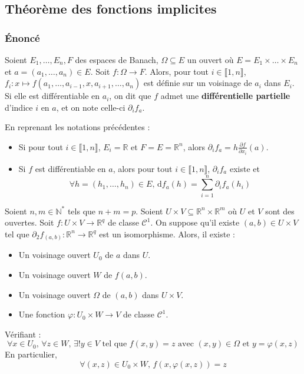 	\subsection{Théorème des fonctions implicites}
	
	\subsubsection{Énoncé}
	
	
	\begin{definition}
		Soient $E_1, \dots, E_n, F$ des espaces de Banach, $\Omega \subseteq E$ un ouvert où $E = E_1 \times \dots \times E_n$ et $a = (a_1, \dots, a_n) \in E$. Soit $f : \Omega \rightarrow F$. Alors, pour tout $i \in \llbracket 1, n \rrbracket$, $f_i : x \mapsto f(a_1, \dots, a_{i-1}, x, a_{i+1}, \dots, a_n)$ est définie sur un voisinage de $a_i$ dans $E_i$. Si elle est différentiable en $a_i$, on dit que $f$ admet une \textbf{différentielle partielle} d'indice $i$ en $a$, et on note celle-ci $\partial_i f_a$.
	\end{definition}
	
	\begin{remark}
		En reprenant les notations précédentes :
		\begin{itemize}
			\item Si pour tout $i \in \llbracket 1, n \rrbracket$, $E_i = \mathbb{R}$ et $F = E = \mathbb{R}^n$, alors $\partial_i f_a = h \frac{\partial f}{\partial x_i} (a)$.
			\item Si $f$ est différentiable en $a$, alors pour tout $i \in \llbracket 1, n \rrbracket$, $\partial_i f_a$ existe et
			\[ \forall h = (h_1, \dots, h_n) \in E, \, \mathrm{d}f_a(h) = \sum_{i=1}^{n} \partial_i f_a(h_i) \]
		\end{itemize}
	\end{remark}
	
	\begin{theorem}
		Soient $n, m \in \mathbb{N}^*$ tels que $n+m=p$. Soient $U \times V \subseteq \mathbb{R}^n \times \mathbb{R}^m$ où $U$ et $V$ sont des ouvertes. Soit $f : U \times V \rightarrow \mathbb{R}^q$ de classe $\mathcal{C}^1$. On suppose qu'il existe $(a,b) \in U \times V$ tel que $\partial_2 f_{(a,b)} : \mathbb{R}^n \rightarrow \mathbb{R}^q$ est un isomorphisme. Alors, il existe :
		\begin{itemize}
			\item Un voisinage ouvert $U_0$ de $a$ dans $U$.
			\item Un voisinage ouvert $W$ de $f(a,b)$.
			\item Un voisinage ouvert $\Omega$ de $(a,b)$ dans $U \times V$.
			\item Une fonction $\varphi : U_0 \times W \rightarrow V$ de classe $\mathcal{C}^1$.
		\end{itemize}
		Vérifiant :
		\[ \forall x \in U_0, \, \forall z \in W, \, \exists! y \in V \text{ tel que } f(x,y)=z \text{ avec } (x, y) \in \Omega \text{ et } y=\varphi(x,z) \]
		En particulier,
		\[ \forall (x,z) \in U_0 \times W, \, f(x, \varphi(x,z)) = z \]
	\end{theorem}
	
